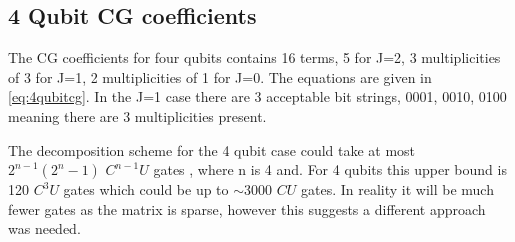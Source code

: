 \subsection{4 Qubit CG coefficients}

The CG coefficients for four qubits contains 16 terms, 5 for J=2, 3 multiplicities of 3 for J=1, 2 multiplicities of 1 for J=0. The equations are given in \autoref{eq:4qubitcg}. In the J=1 case there are 3 acceptable bit strings, 0001, 0010, 0100 meaning there are 3 multiplicities present. 

The decomposition scheme for the 4 qubit case could take at most $2^{n-1}(2^n-1)$ $C^{n-1}U$ gates \cite{li2013decomposition}, where n is 4 and. For 4 qubits this upper bound is 120 $C^3U$ gates which could be up to $\sim 3000$ $CU$ gates. In reality it will be much fewer gates as the matrix is sparse, however this suggests a different approach was needed.

